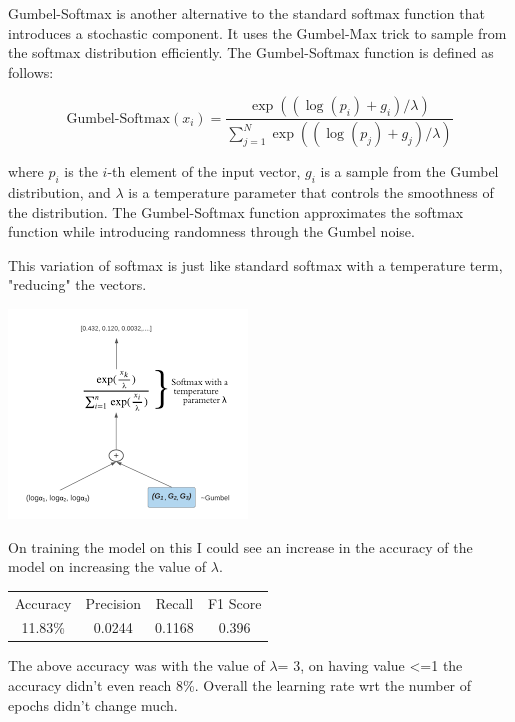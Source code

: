\documentclass{article}
\begin{document}
Gumbel-Softmax is another alternative to the standard softmax function that introduces a stochastic component. It uses the Gumbel-Max trick to sample from the softmax distribution efficiently. The Gumbel-Softmax function is defined as follows:

\[
\text{Gumbel-Softmax}(x_i) = \frac{\exp((\log(p_i) + g_i)/\lambda)}{\sum_{j=1}^{N}\exp((\log(p_j) + g_j)/\lambda)}
\]

where \(p_i\) is the \(i\)-th element of the input vector, \(g_i\) is a sample from the Gumbel distribution, and \(\lambda\) is a temperature parameter that controls the smoothness of the distribution. The Gumbel-Softmax function approximates the softmax function while introducing randomness through the Gumbel noise.

This variation of softmax is just like standard softmax with a temperature term, "reducing" the vectors.

\includegraphics{images/lolgumbelsoftmax.png}

On training the model on this I could see an increase in the accuracy of the model on increasing the value of \(\lambda\).

\begin{center}
\begin{tabular}{ |c|c|c|c| } 
 \hline
 Accuracy & Precision & Recall & F1 Score \\ 
 11.83\% & 0.0244 & 0.1168 & 0.396 \\
 \hline
\end{tabular}
\end{center}

The above accuracy was with the value of \(\lambda\)= 3, on having value <=1 the accuracy didn't even reach 8\%. Overall the learning rate wrt the number of epochs didn't change much.
\end{document}
